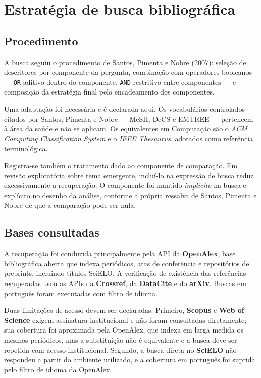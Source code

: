 \documentclass[12pt,a4paper]{article}
\begin{document}
\section{Estratégia de busca bibliográfica}

\subsection{Procedimento}

A busca seguiu o procedimento de Santos, Pimenta e Nobre (2007): seleção de descritores por
componente da pergunta, combinação com operadores booleanos --- \texttt{OR} aditivo
dentro do componente, \texttt{AND} restritivo entre componentes --- e composição da
estratégia final pelo encadeamento dos componentes.

Uma adaptação foi necessária e é declarada aqui. Os vocabulários controlados citados
por Santos, Pimenta e Nobre --- MeSH, DeCS e EMTREE --- pertencem à área da saúde e não
se aplicam. Os equivalentes em Computação são o \emph{ACM Computing Classification
System} e o \emph{IEEE Thesaurus}, adotados como referência terminológica.

Registra-se também o tratamento dado ao componente de comparação. Em revisão
exploratória sobre tema emergente, incluí-lo na expressão de busca reduz
excessivamente a recuperação. O componente foi mantido \emph{implícito} na busca e
explícito no desenho da análise, conforme a própria ressalva de
Santos, Pimenta e Nobre de que a comparação pode ser nula.

\subsection{Bases consultadas}

A recuperação foi conduzida principalmente pela API da \textbf{OpenAlex}, base
bibliográfica aberta que indexa periódicos, atas de conferência e repositórios de
preprints, incluindo títulos SciELO. A verificação de existência das referências
recuperadas usou as APIs da \textbf{Crossref}, da \textbf{DataCite} e do
\textbf{arXiv}. Buscas em português foram executadas com filtro de idioma.

Duas limitações de acesso devem ser declaradas. Primeiro, \textbf{Scopus} e
\textbf{Web of Science} exigem assinatura institucional e não foram consultadas
diretamente; sua cobertura foi aproximada pela OpenAlex, que indexa em larga medida os
mesmos periódicos, mas a substituição não é equivalente e a busca deve ser repetida
com acesso institucional. Segundo, a busca direta no \textbf{SciELO} não respondeu a
partir do ambiente utilizado, e a cobertura em português foi suprida pelo filtro de
idioma da OpenAlex.
\end{document}
